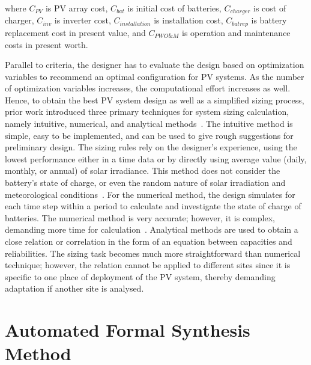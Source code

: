 \documentclass[journal]{IEEEtran}
\begin{document}
\noindent where $C_{PV}$ is PV array cost, $C_{bat}$ is initial cost of batteries, $C_{charger}$ is cost of charger, $C_{inv}$ is inverter cost, $C_{installation}$ is installation cost, $C_{batrep}$ is battery replacement cost in present value, and $C_{PWO\&M}$ is operation and maintenance costs in present worth.

Parallel to criteria, the designer has to evaluate the design based on optimization variables to recommend an optimal configuration for PV systems. As the number of optimization variables increases, the computational effort increases as well. Hence, to obtain the best PV system design as well as a simplified sizing process, prior work introduced three primary techniques for system sizing calculation, namely intuitive, numerical, and analytical methods~\cite{Zhou2010}. The intuitive method is simple, easy to be implemented, and can be used to give rough suggestions for preliminary design. The sizing rules rely on the designer's experience, using the lowest performance either in a time data or by directly using average value (daily, monthly, or annual) of solar irradiance. This method does not consider the battery's state of charge, or even the random nature of solar irradiation and meteorological conditions~\cite{Alsadi2018}. For the numerical method, the design simulates for each time step within a period to calculate and investigate the state of charge of batteries. The numerical method is very accurate; however, it is complex, demanding more time for calculation~\cite{Park2004}. Analytical methods are used to obtain a close relation or correlation in the form of an equation between capacities and reliabilities. The sizing task becomes much more straightforward than numerical technique; however, the relation cannot be applied to different sites since it is specific to one place of deployment of the PV system, thereby demanding adaptation if another site is analysed.

\section{Automated Formal Synthesis Method}
\label{sec:Method}
\end{document}
